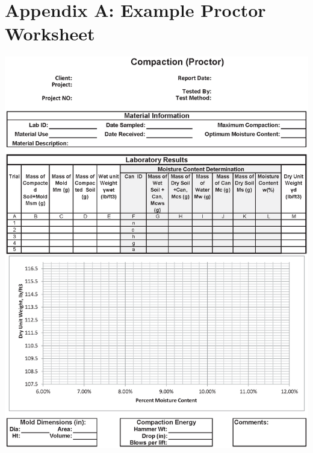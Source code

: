 \documentclass[12pt]{article}
\begin{document}
%
%

\pagebreak

\section*{Appendix A: Example Proctor Worksheet}
\label{AppendixA}
\begin{center}
    \includegraphics[width=1\linewidth]{Example_Compaction_Report.eps}
\end{center}

\end{document}
